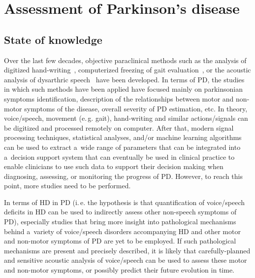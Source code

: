 \chapter[Assessment of Parkinson's disease]{Assessment of Parkinson's disease}
\label{ch5}

\section{State of knowledge}
\label{ch5_1}

Over the last few decades, objective paraclinical methods such as the analysis of digitized hand-writing~\cite{Drotar2014, Faundez-Zanuy2014, Drotar2015, Mucha2018a}, computerized freezing of gait evaluation~\cite{Factor2014, Rocha2014}, or the acoustic analysis of dysarthric speech~\cite{Mekyska2011b_eng, Eliasova2013, Mekyska2015, Smekal2015c} have been developed. In terms of PD, the studies in which such methods have been applied have focused mainly on parkinsonian symptoms identification, description of the relationships between motor and non-motor symptoms of the disease, overall severity of PD estimation, etc. In theory, voice/speech, movement (e.\,g. gait), hand-writing and similar actions/signals can be digitized and processed remotely on computer. After that, modern signal processing techniques, statistical analyses, and/or machine learning algorithms can be used to extract a~wide range of parameters that can be integrated into a~decision support system that can eventually be used in clinical practice to enable clinicians to use such data to support their decision making when diagnosing, assessing, or monitoring the progress of PD. However, to reach this point, more studies need to be performed. 

In terms of HD in PD (i.\,e. the hypothesis is that quantification of voice/speech deficits in HD can be used to indirectly assess other non-speech symptoms of PD), especially studies that bring more insight into pathological mechanisms behind a~variety of voice/speech disorders accompanying HD and other motor and non-motor symptoms of PD are yet to be employed. If such pathological mechanisms are present and precisely described, it is likely that carefully-planned and sensitive acoustic analysis of voice/speech can be used to assess these motor and non-motor symptoms, or possibly predict their future evolution in time. 

